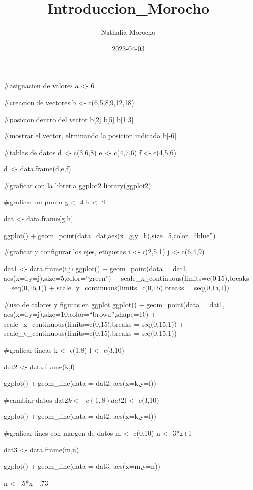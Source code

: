 \documentclass[
]{article}
\title{Introduccion\_Morocho}
\author{Nathalia Morocho}
\date{2023-04-03}
\begin{document}
\maketitle

\#asignacion de valores a \textless- 6

\#creacion de vectores b \textless- c(6,5,8,9,12,18)

\#posicion dentro del vector b{[}2{]} b{[}5{]} b{[}1:3{]}

\#mostrar el vector, eliminando la posicion indicada b{[}-6{]}

\#tablas de datos d \textless- c(3,6,8) e \textless- c(4,7,6) f
\textless- c(4,5,6)

d \textless- data.frame(d,e,f)

\#graficar con la libreria ggplot2 library(ggplot2)

\#graficar un punto g \textless- 4 h \textless- 9

dat \textless- data.frame(g,h)

ggplot() + geom\_point(data=dat,aes(x=g,y=h),size=5,color=``blue'')

\#graficar y configurar los ejes, etiquetas i \textless- c(2,5,1) j
\textless- c(6,4,9)

dat1 \textless- data.frame(i,j) ggplot() + geom\_point(data = dat1,
aes(x=i,y=j),size=5,color=``green'') +
scale\_x\_continuous(limits=c(0,15),breaks = seq(0,15,1)) +
scale\_y\_continuous(limits=c(0,15),breaks = seq(0,15,1))

\#uso de colores y figuras en ggplot ggplot() + geom\_point(data = dat1,
aes(x=i,y=j),size=10,color=``brown'',shape=10) +
scale\_x\_continuous(limits=c(0,15),breaks = seq(0,15,1)) +
scale\_y\_continuous(limits=c(0,15),breaks = seq(0,15,1))

\#graficar lineas k \textless- c(1,8) l \textless- c(3,10)

dat2 \textless- data.frame(k,l)

ggplot() + geom\_line(data = dat2, aes(x=k,y=l))

\#cambiar datos dat2\(k <- c(1,8) dat2\)l \textless- c(3,10)

ggplot() + geom\_line(data = dat2, aes(x=k,y=l))

\#graficar lines con margen de datos m \textless- c(0,10) n \textless-
3*x+1

dat3 \textless- data.frame(m,n)

ggplot() + geom\_line(data = dat3, aes(x=m,y=n))

n \textless- .5*x - .73
\end{document}
